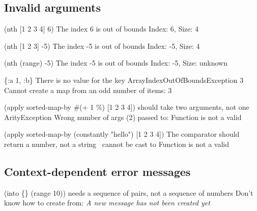 \documentclass[12pt]{article}
\begin{document}
\subsection{Invalid arguments}
\begin{exceptiontable}
{(nth [1 2 3 4] 6)}
{The index 6 is out of bounds}
{\ioobe}
{}
{\ioobe}
{Index: 6, Size: 4}

{(nth [1 2 3] -5)}
{The index -5 is out of bounds}
{\ioobe}
{}
{\ioobe}
{Index: -5, Size: 4}

{(nth (range) -5)}
{The index -5 is out of bounds}
{\ioobe}
{}
{\ioobe}
{Index: -5, Size: unknown}

{\{:a 1, :b\}}
{There is no value for the key }
{ArrayIndexOutOfBoundsException}
{3}
{\iae}
{Cannot create a map from an odd number of items: 3}

{(apply sorted-map-by \#(+ 1 \%) [1 2 3 4])}
{ should take two arguments, not one}
{ArityException}
{Wrong number of args (2) passed to: }
{\iae}
{Function is not a valid }

{(apply sorted-map-by (constantly "hello") [1 2 3 4])}
{The comparator should return a number, not a string}
{\cce}
{\jlstring~cannot be cast to \jlnum}
{\iae}
{Function is not a valid }
\end{exceptiontable}

\subsection{Context-dependent error messages}
\begin{exceptiontable}
{(into \{\} (range 10))}
{ needs a sequence of pairs, not a sequence of numbers}
{\iae}
{Don't know how to create  from: \jllong}
{}
{\emph{A new message has not been created yet}}
\end{exceptiontable}
\end{document}
